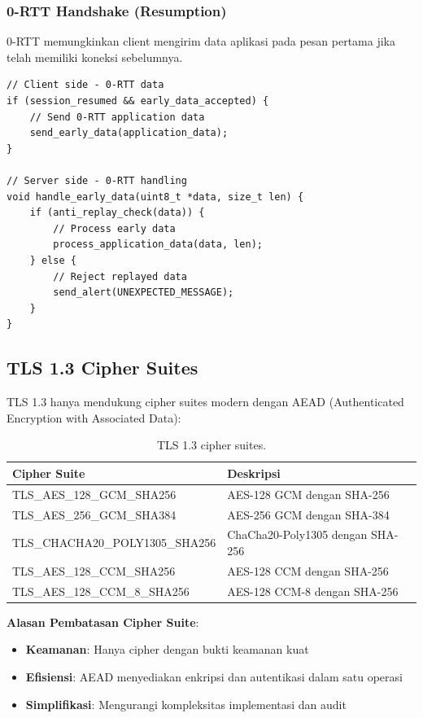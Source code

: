 \subsubsection{0-RTT Handshake (Resumption)}

0-RTT memungkinkan client mengirim data aplikasi pada pesan pertama jika telah memiliki koneksi sebelumnya.

\begin{lstlisting}[style=cstyle, caption={TLS 1.3 0-RTT Implementation}]
// Client side - 0-RTT data
if (session_resumed && early_data_accepted) {
    // Send 0-RTT application data
    send_early_data(application_data);
}

// Server side - 0-RTT handling
void handle_early_data(uint8_t *data, size_t len) {
    if (anti_replay_check(data)) {
        // Process early data
        process_application_data(data, len);
    } else {
        // Reject replayed data
        send_alert(UNEXPECTED_MESSAGE);
    }
}
\end{lstlisting}

\subsection{TLS 1.3 Cipher Suites}

TLS 1.3 hanya mendukung cipher suites modern dengan AEAD (Authenticated Encryption with Associated Data):

\begin{table}[htbp]
  \centering
  \small
  \begin{tabular}{ll}
    \toprule
    Cipher Suite & Deskripsi \\
    \midrule
    TLS\_AES\_128\_GCM\_SHA256 & AES-128 GCM dengan SHA-256 \\
    TLS\_AES\_256\_GCM\_SHA384 & AES-256 GCM dengan SHA-384 \\
    TLS\_CHACHA20\_POLY1305\_SHA256 & ChaCha20-Poly1305 dengan SHA-256 \\
    TLS\_AES\_128\_CCM\_SHA256 & AES-128 CCM dengan SHA-256 \\
    TLS\_AES\_128\_CCM\_8\_SHA256 & AES-128 CCM-8 dengan SHA-256 \\
    \bottomrule
  \end{tabular}
  \caption{TLS 1.3 cipher suites.}
\end{table}

\textbf{Alasan Pembatasan Cipher Suite}:
\begin{itemize}
  \item \textbf{Keamanan}: Hanya cipher dengan bukti keamanan kuat
  \item \textbf{Efisiensi}: AEAD menyediakan enkripsi dan autentikasi dalam satu operasi
  \item \textbf{Simplifikasi}: Mengurangi kompleksitas implementasi dan audit
\end{itemize}

